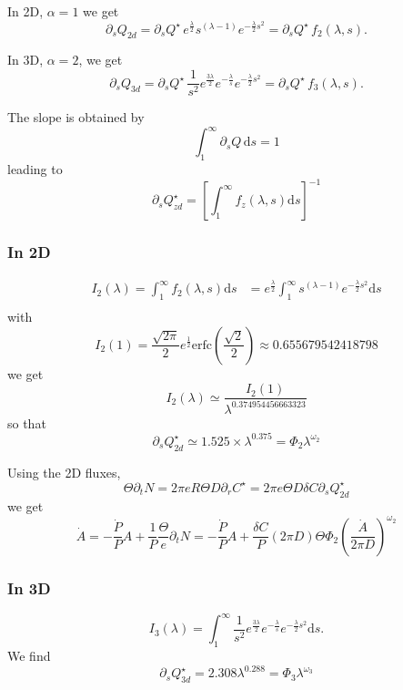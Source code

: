 \documentclass[11pt]{revtex4}
\begin{document}
In 2D, $\alpha=1$ we get
\begin{equation}
	\label{eq:dsQ2d}
	\partial_s Q_{2d} = \partial_s Q^\star \, e^{\frac{\lambda}{2}}s^{(\lambda-1)}e^{-\frac{\lambda}{2}s^2} = \partial_s Q^\star \, f_2(\lambda,s).
\end{equation}

In 3D, $\alpha=2$, we get
\begin{equation}
	\label{eq:dsQ3d}
	\partial_s Q_{3d} = \partial_s Q^\star \, \dfrac{1}{s^2} e^{\frac{3\lambda}{2}} e^{-\frac{\lambda}{s}} e^{-\frac{\lambda}{2}s^2} = \partial_s Q^\star \, f_3(\lambda,s).
\end{equation}

The slope is obtained by
$$
	\int_1^\infty \partial_s Q \, \mathrm{d} s = 1
$$
leading to
\begin{equation}
	\partial_sQ^\star_{zd} = \left[ \int_1^\infty f_z(\lambda,s) \mathrm{d}s \right] ^{-1}
\end{equation}

\subsubsection{In 2D}
\begin{equation}
	\begin{array}{rl}
	I_2(\lambda) = \int_1^\infty f_2(\lambda,s) \mathrm{d}s & =  e^{\frac{\lambda}{2}}\int_1^\infty s^{(\lambda-1)}e^{-\frac{\lambda}{2}s^2 } \mathrm{d}s\\
	\end{array}
\end{equation}
with 
$$
	I_2(1) = \dfrac{\sqrt{2\pi}}{2} e^{\frac{1}{2}} \mathrm{erfc}
	\left(\dfrac{\sqrt{2}}{2}\right) \approx 0.655679542418798
$$
we get 
$$
	I_2(\lambda) \simeq \dfrac{I_2(1)}{\lambda^{0.374954456663323}}
$$
so that
\begin{equation}
	\partial_s Q^\star_{2d} \simeq 1.525 \times \lambda^{0.375} = \Phi_2 \lambda^{\omega_2}
\end{equation}

Using the 2D fluxes,
$$
\Theta \partial_t N = 	2\pi e R \Theta D \partial_rC^\star
= 2\pi e \Theta D \delta C  \partial_s Q^\star_{2d}
$$
we get
$$
	\dot{A}  =  -\dfrac{\dot{P}}{P} A + \dfrac{1}{P} \dfrac{\Theta}{e} \partial_t N 
	=  -\dfrac{\dot{P}}{P} A + \dfrac{\delta C}{P} (2\pi D) \Theta \Phi_2 \left(\dfrac{\dot{A}}{2\pi D}\right)^{\omega_2}
$$

\subsubsection{In 3D}
\begin{equation}
	I_3(\lambda) = \int_1^\infty \dfrac{1}{s^2} e^{\frac{3\lambda}{2}} e^{-\frac{\lambda}{s}} e^{-\frac{\lambda}{2}s^2} \mathrm{d}s.
\end{equation}
We find
\begin{equation}
	\partial_s Q^\star_{3d} = 2.308 \lambda^{0.288} = \Phi_3 \lambda ^ {\omega_3}
\end{equation}
\end{document}
